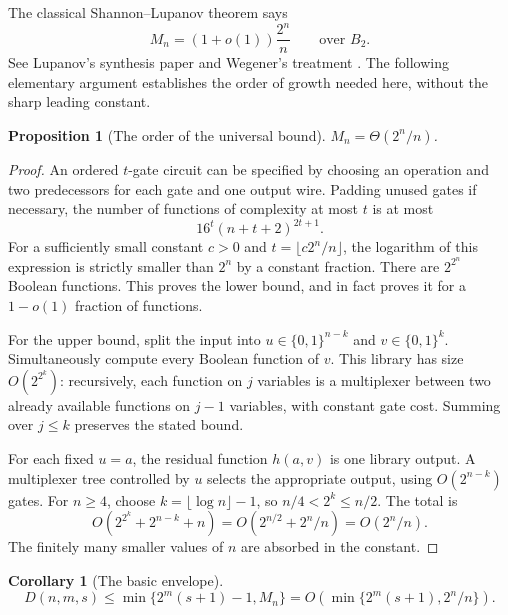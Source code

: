 \documentclass[11pt]{article}
\newtheorem{proposition}[theorem]{Proposition}
\newtheorem{corollary}[theorem]{Corollary}
\theoremstyle{definition}
\theoremstyle{remark}
\newcommand{\B}{\{0,1\}}
\begin{document}
The classical Shannon--Lupanov theorem says
\begin{equation}\label{eq:shannon}
 M_n=(1+o(1))\frac{2^n}{n}
 \qquad\text{over }B_2.
\end{equation}
See Lupanov's synthesis paper and Wegener's treatment
\citep{Lupanov1958,Wegener1987}. The following elementary argument
establishes the order of growth needed here, without the sharp leading
constant.

\begin{proposition}[The order of the universal bound]\label{prop:synthesis}
$M_n=\Theta(2^n/n)$.
\end{proposition}
\begin{proof}
An ordered $t$-gate circuit can be specified by choosing an operation
and two predecessors for each gate and one output wire. Padding unused
gates if necessary, the number of functions of complexity at most $t$
is at most
\begin{equation}\label{eq:count-deterministic}
 16^t(n+t+2)^{2t+1}.
\end{equation}
For a sufficiently small constant $c>0$ and $t=\lfloor c2^n/n\rfloor$, the logarithm
of this expression is strictly smaller than $2^n$ by a constant
fraction. There are $2^{2^n}$ Boolean functions. This proves the lower
bound, and in fact proves it for a $1-o(1)$ fraction of functions.

For the upper bound, split the input into $u\in\B^{n-k}$ and
$v\in\B^k$. Simultaneously compute every Boolean function of $v$.
This library has size $O(2^{2^k})$: recursively, each function on $j$
variables is a multiplexer between two already available functions on
$j-1$ variables, with constant gate cost. Summing over $j\le k$
preserves the stated bound.

For each fixed $u=a$, the residual function $h(a,v)$ is one library
output. A multiplexer tree controlled by $u$ selects the appropriate
output, using $O(2^{n-k})$ gates. For $n\ge4$, choose
$k=\lfloor\log n\rfloor-1$, so $n/4<2^k\le n/2$. The total is
\[
 O(2^{2^k}+2^{n-k}+n)
   =O(2^{n/2}+2^n/n)=O(2^n/n).
\]
The finitely many smaller values of $n$ are absorbed in the constant.
\end{proof}

\begin{corollary}[The basic envelope]\label{cor:envelope}
\begin{equation}\label{eq:envelope}
 D(n,m,s)\le\min\{2^m(s+1)-1,M_n\}
          =O\!\left(\min\{2^m(s+1),2^n/n\}\right).
\end{equation}
\end{corollary}
\end{document}
